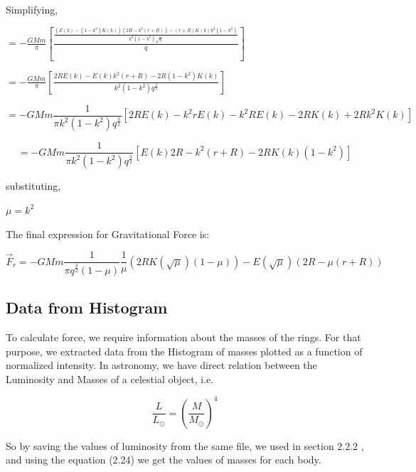 Simplifying,

\begin{center}


$ = - \frac{GMm }{\pi} [\frac{\frac{(E(k)- (1 - k^2 )K(k))(2 R - k^2 (r + R)) - (r + R) K(k) k^2 (1 - k^2)}{k^2 (1-k^2)\sqrt{q}}}{q}] $


$ = - \frac{GMm }{\pi} [\frac{2 R E(k) - E (k) k^2 (r+R) - 2 R(1-k^2) K(k)}{k^2 (1 - k^2) q^\frac{3}{2}}] $





\begin{equation}
 = - GMm \frac{1}{\pi k^2 (1 - k ^2)  q^\frac{3}{2}} [2 R E (k) - k^2 r E(k)- k^2 R E(k) - 2 R K(k) + 2 R k^2 K(k)]
\end{equation}

\begin{equation}
 = - GMm \frac{1}{\pi k^2 (1 - k ^2)  q^\frac{3}{2}} [E (k) 2R - k^2 (r + R) - 2 R K(k) (1 - k^2) ] 
\end{equation}
\end{center}
 
substituting,
 \begin{center}
 $ \mu = k^2  $
 \end{center}


The final expression for Gravitational Force is:
\begin{center}

\begin{equation}
 \vec{F}_{r} = - GMm \frac{1}{\pi q^ \frac{3}{2} (1- \mu)} \frac{1}{\mu} (2 R K(\sqrt{\mu}) (1 - \mu))- E (\sqrt{\mu}) (2 R - \mu (r + R))
\end{equation}

\end{center}

\subsection{Data from Histogram}
To calculate force, we require information about the masses of the rings. For that purpose, we extracted data from the Histogram of masses plotted as a function of normalized intensity. In astronomy, we have direct relation between the Luminosity and Masses of a celestial object, i.e. 

\begin{equation}
\frac{L}{L_{\odot}} = (\frac{M}{M_{\odot}})^4 
\end{equation}

So by saving the values of luminosity from the same file, we used in section 2.2.2 , and using the equation (2.24) we get the values of masses for each body.  


